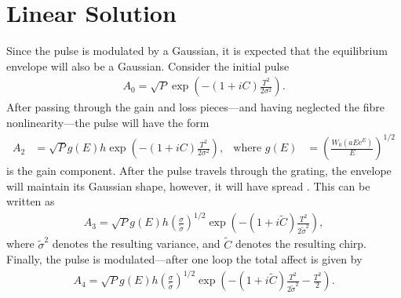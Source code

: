 
\chapter{Linear Solution}
Since the pulse is modulated by a Gaussian, it is expected that the equilibrium envelope will also be a Gaussian. Consider the initial pulse
\begin{align*}
	A_0 = \sqrt{P} \exp \left( -(1 + iC) \frac{T^2}{2 \sigma^2} \right).
\end{align*}
After passing through the gain and loss pieces---and having neglected the fibre nonlinearity---the pulse will have the form
\begin{align*}
	A_2 &= \sqrt{P} g(E) h \exp \left( -(1 + iC) \frac{T^2}{2 \sigma^2} \right),& \text{where } g(E) &= \left( \frac{W_0(a E \textrm{e}^E)}{E} \right)^{1/2}
\end{align*}
is the gain component. After the pulse travels through the grating, the envelope will maintain its Gaussian shape, however, it will have spread \cite{agrawal2013}. This can be written as
\begin{align}
\label{linear1}
	A_3 = \sqrt{P} g(E) h \left( \frac{\sigma}{\widetilde{\sigma}} \right)^{1/2} \exp \left( -(1 + i \widetilde{C}) \frac{T^2}{2 \widetilde{\sigma}^2} \right),
\end{align}
where $\widetilde{\sigma}^2$ denotes the resulting variance, and $\widetilde{C}$ denotes the resulting chirp. Finally, the pulse is modulated---after one loop the total affect is given by
\begin{align}
\label{linear2}
	A_4 = \sqrt{P} g(E) h \left( \frac{\sigma}{\widetilde{\sigma}} \right)^{1/2} \exp \left( -(1 + i \widetilde{C}) \frac{T^2}{2 \widetilde{\sigma}^2} - \frac{T^2}{2} \right).
\end{align}


